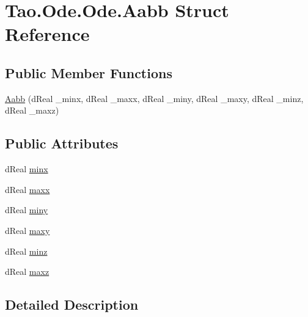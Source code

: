 \hypertarget{struct_tao_1_1_ode_1_1_ode_1_1_aabb}{
\section{Tao.Ode.Ode.Aabb Struct Reference}
\label{struct_tao_1_1_ode_1_1_ode_1_1_aabb}
}
\subsection*{Public Member Functions}
\begin{DoxyCompactItemize}
\item 
\hyperlink{struct_tao_1_1_ode_1_1_ode_1_1_aabb_afdc595a87569ea3037919aabbea91ec8}{Aabb} (dReal \_\-minx, dReal \_\-maxx, dReal \_\-miny, dReal \_\-maxy, dReal \_\-minz, dReal \_\-maxz)
\end{DoxyCompactItemize}
\subsection*{Public Attributes}
\begin{DoxyCompactItemize}
\item 
dReal \hyperlink{struct_tao_1_1_ode_1_1_ode_1_1_aabb_a9140ff61e69a9b990bab195edc186392}{minx}
\item 
dReal \hyperlink{struct_tao_1_1_ode_1_1_ode_1_1_aabb_a17707d5ffb42b522263f1e87cf82a1c4}{maxx}
\item 
dReal \hyperlink{struct_tao_1_1_ode_1_1_ode_1_1_aabb_ad894fc0972b1910203f6ab71c3f07f36}{miny}
\item 
dReal \hyperlink{struct_tao_1_1_ode_1_1_ode_1_1_aabb_a9c2841eefd732f6e32b72042b82f31e9}{maxy}
\item 
dReal \hyperlink{struct_tao_1_1_ode_1_1_ode_1_1_aabb_aaf7537c3877c100d2cf857b04d1b9eb2}{minz}
\item 
dReal \hyperlink{struct_tao_1_1_ode_1_1_ode_1_1_aabb_ac5d877495468bd25191c352540e6be92}{maxz}
\end{DoxyCompactItemize}


\subsection{Detailed Description}


